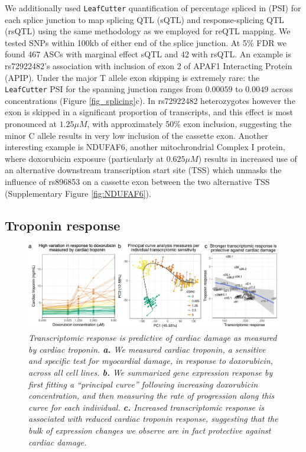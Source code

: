 \documentclass{article}
\begin{document}
{We additionally used \texttt{LeafCutter} quantification of percentage spliced in (PSI) for each splice junction to map splicing QTL (sQTL) and response-splicing QTL (rsQTL) using the same methodology as we employed for reQTL mapping. We tested SNPs within 100kb of either end of the splice junction. At 5\% FDR we found 467 ASCs with marginal effect sQTL and 42 with rsQTL. An example is rs72922482's association with inclusion of exon 2 of APAF1 Interacting Protein (APIP). Under the major T allele exon skipping is extremely rare: the \texttt{LeafCutter} PSI for the spanning junction ranges from $0.00059$ to $0.0049$ across concentrations (Figure \ref{fig_splicing}c). In rs72922482 heterozygotes however the exon is skipped in a significant proportion of transcripts, and this effect is most pronounced at $1.25 \mu M$, with approximately 50\% exon inclusion, suggesting the minor C allele results in very low inclusion of the cassette exon. Another interesting example is NDUFAF6, another mitochrondrial Complex I protein, where doxorubicin exposure (particularly at $0.625 \mu M$) results in increased use of an alternative downstream transcription start site (TSS) which unmasks the influence of rs896853 on a cassette exon between the two alternative TSS (Supplementary Figure \ref{fig:NDUFAF6}).

\subsection*{Troponin response}

\begin{figure}
\begin{center}
    \includegraphics[width=1\textwidth]{../figures/fig4_troponin.pdf}     \caption{\it{Transcriptomic response is predictive of cardiac damage as measured by cardiac troponin. \textbf{a.} We measured cardiac troponin, a sensitive and specific test for myocardial damage, in response to doxorubicin, across all cell lines. \textbf{b.} We summarized gene expression response by first fitting a ``principal curve'' following increasing doxorubicin concentration, and then measuring the rate of progression along this curve for each individual. \textbf{c.} Increased transcriptomic response is associated with reduced cardiac troponin response, suggesting that the bulk of expression changes we observe are in fact protective against cardiac damage.}}
    \label{fig_troponin}
    \end{center}
\end{figure}

}
\end{document}
